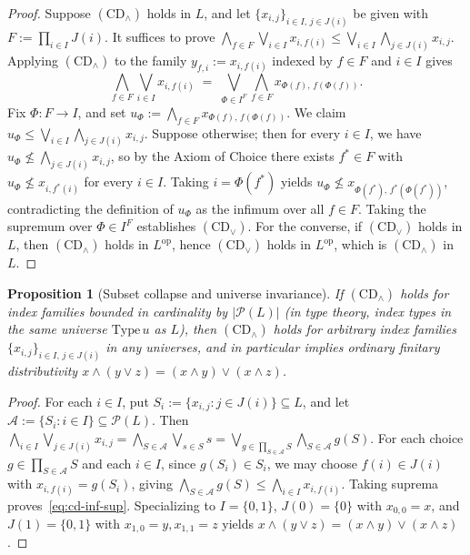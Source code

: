 \documentclass[11pt,a4paper]{article}
\theoremstyle{plain}
\newtheorem{proposition}[theorem]{Proposition}
\theoremstyle{definition}
\newcommand{\CDinf}{\mathrm{CD}_{\wedge}}
\newcommand{\CDsup}{\mathrm{CD}_{\vee}}
\newcommand{\op}{\mathrm{op}}
\begin{document}
\begin{proof}
Suppose $(\CDinf)$ holds in $L$, and let $\{x_{i,j}\}_{i \in I,\, j \in J(i)}$ be given
with $F := \prod_{i \in I} J(i)$. It suffices to prove
$\bigwedge_{f \in F} \bigvee_{i \in I} x_{i, f(i)} \le \bigvee_{i \in I} \bigwedge_{j \in J(i)} x_{i,j}$.
Applying $(\CDinf)$ to the family $y_{f,i} := x_{i, f(i)}$ indexed by $f \in F$ and $i \in I$ gives
\[
  \bigwedge_{f \in F} \bigvee_{i \in I} x_{i, f(i)}
  \;=\;
  \bigvee_{\Phi \in I^F} \bigwedge_{f \in F} x_{\Phi(f),\, f(\Phi(f))}.
\]
Fix $\Phi : F \to I$, and set $u_\Phi := \bigwedge_{f \in F} x_{\Phi(f),\, f(\Phi(f))}$.
We claim $u_\Phi \le \bigvee_{i \in I} \bigwedge_{j \in J(i)} x_{i,j}$. Suppose otherwise;
then for every $i \in I$, we have $u_\Phi \not\le \bigwedge_{j \in J(i)} x_{i,j}$, so
by the Axiom of Choice there exists $f^* \in F$ with $u_\Phi \not\le x_{i, f^*(i)}$ for
every $i \in I$. Taking $i = \Phi(f^*)$ yields $u_\Phi \not\le x_{\Phi(f^*),\, f^*(\Phi(f^*))}$,
contradicting the definition of $u_\Phi$ as the infimum over all $f \in F$. Taking the
supremum over $\Phi \in I^F$ establishes $(\CDsup)$. For the converse, if $(\CDsup)$ holds
in $L$, then $(\CDinf)$ holds in $L^{\op}$, hence $(\CDsup)$ holds in $L^{\op}$, which is
$(\CDinf)$ in $L$.
\end{proof}

\begin{proposition}[Subset collapse and universe invariance]
\label{prop:subset-collapse}
If $(\CDinf)$ holds for index families bounded in cardinality by $|\mathcal{P}(L)|$
(in type theory, index types in the same universe $\mathrm{Type}\,u$ as $L$), then
$(\CDinf)$ holds for arbitrary index families $\{x_{i,j}\}_{i \in I,\, j \in J(i)}$ in any
universes, and in particular implies ordinary finitary distributivity
$x \wedge (y \vee z) = (x \wedge y) \vee (x \wedge z)$.
\end{proposition}

\begin{proof}
For each $i \in I$, put $S_i := \{x_{i,j} : j \in J(i)\} \subseteq L$, and let
$\mathcal{A} := \{S_i : i \in I\} \subseteq \mathcal{P}(L)$. Then
$\bigwedge_{i \in I} \bigvee_{j \in J(i)} x_{i,j} = \bigwedge_{S \in \mathcal{A}} \bigvee_{s \in S} s
= \bigvee_{g \in \prod_{S \in \mathcal{A}} S} \bigwedge_{S \in \mathcal{A}} g(S)$.
For each choice $g \in \prod_{S \in \mathcal{A}} S$ and each $i \in I$, since $g(S_i) \in S_i$,
we may choose $f(i) \in J(i)$ with $x_{i, f(i)} = g(S_i)$, giving
$\bigwedge_{S \in \mathcal{A}} g(S) \le \bigwedge_{i \in I} x_{i, f(i)}$. Taking suprema
proves~\eqref{eq:cd-inf-sup}. Specializing to $I = \{0, 1\}$, $J(0) = \{0\}$ with
$x_{0,0} = x$, and $J(1) = \{0, 1\}$ with $x_{1,0} = y, x_{1,1} = z$ yields
$x \wedge (y \vee z) = (x \wedge y) \vee (x \wedge z)$.
\end{proof}
\end{document}

